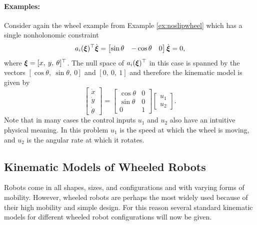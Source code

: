 \paragraph{Examples:} Consider again the wheel example from Example \ref{ex:noslipwheel} which has a single nonholonomic constraint
\begin{equation*}
a_i(\bm{\xi})^\top \dot{\bm{\xi}} = \begin{bmatrix}
\sin \theta & -\cos \theta & 0
\end{bmatrix}\dot{\bm{\xi}}=0,
\end{equation*}
where $\bm{\xi} = [x,\:y, \:\theta]^\top $. The null space of $a_i(\bm{\xi})^\top $ in this case is spanned by the vectors $[\cos \theta, \: \sin \theta,\: 0]$ and $[0, \: 0,\: 1]$ and therefore the kinematic model is given by
\begin{equation} \label{eq:wheelkinmodel}
\begin{bmatrix}
\dot{x} \\ \dot{y} \\ \dot{\theta}
\end{bmatrix} = \begin{bmatrix}
\cos \theta & 0 \\
\sin\theta & 0 \\
0 & 1
\end{bmatrix}\begin{bmatrix}
u_1 \\ u_2
\end{bmatrix}.
\end{equation}
Note that in many cases the control inputs $u_1$ and $u_2$ also have an intuitive physical meaning. In this problem $u_1$ is the speed at which the wheel is moving, and $u_2$ is the angular rate at which it rotates. 

\subsection{Kinematic Models of Wheeled Robots}
Robots come in all shapes, sizes, and configurations and with varying forms of mobility. However, wheeled robots are perhaps the most widely used because of their high mobility and simple design. For this reason several standard kinematic models for different wheeled robot configurations will now be given.

